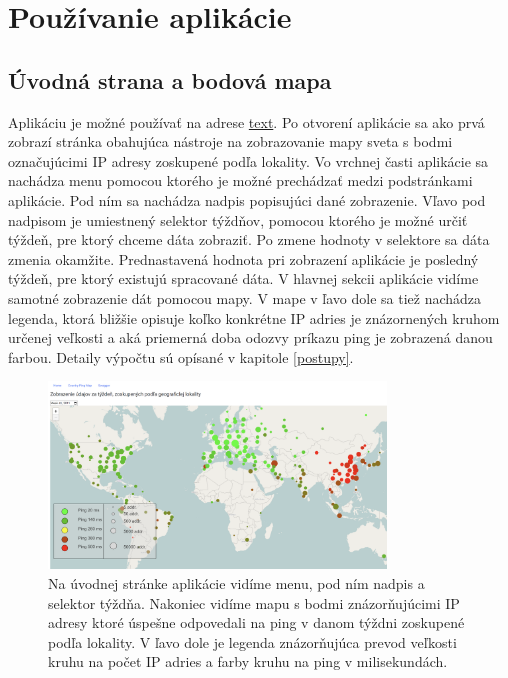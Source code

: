 \chapter{Používanie aplikácie}

\label{kap:pouzivanie}

\section{Úvodná strana a bodová mapa}

Aplikáciu je možné používať na adrese \href{adresa}{text}. Po otvorení aplikácie sa ako prvá zobrazí stránka obahujúca nástroje na 
zobrazovanie mapy sveta s bodmi označujúcimi IP adresy zoskupené podľa lokality. Vo vrchnej časti aplikácie sa nachádza menu pomocou 
ktorého je možné prechádzať medzi podstránkami aplikácie. Pod ním sa nachádza nadpis popisujúci dané zobrazenie. Vľavo pod nadpisom je umiestnený 
selektor týždňov, pomocou ktorého je možné určiť týždeň, pre ktorý chceme dáta zobraziť. Po zmene hodnoty v selektore sa dáta zmenia okamžite. 
Prednastavená hodnota pri zobrazení aplikácie je posledný týždeň, pre ktorý existujú spracované dáta. V hlavnej sekcii aplikácie vidíme samotné 
zobrazenie dát pomocou mapy. V mape v ľavo dole sa tiež nachádza legenda, ktorá bližšie opisuje koľko konkrétne IP adries je znázornených kruhom 
určenej veľkosti a aká priemerná doba odozvy príkazu ping je zobrazená danou farbou. Detaily výpočtu sú opísané v kapitole \ref{postupy}. 

\begin{figure}
    \centerline{\includegraphics[width=0.8\textwidth]{images/map-points}}
    \caption[Úvodná strana s mapou]{Na úvodnej stránke aplikácie vidíme menu, pod ním nadpis a selektor týždňa. Nakoniec vidíme mapu s bodmi 
    znázorňujúcimi IP adresy ktoré úspešne odpovedali na ping v danom týždni zoskupené podľa lokality. V ľavo dole je legenda znázorňujúca prevod veľkosti
    kruhu na počet IP adries a farby kruhu na ping v milisekundách.}
    \label{obr:map-points}
\end{figure}

